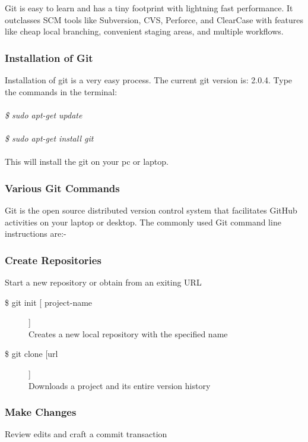 \noindent Git is easy to learn and has a tiny footprint with lightning fast performance. It outclasses SCM tools like Subversion, CVS, Perforce, and ClearCase with features like cheap local branching, convenient staging areas, and multiple workflows.

\subsubsection{Installation of Git}

Installation of git is a very easy process.
The current git version is: 2.0.4.
Type the commands in the terminal:\\\\
\emph{
\$ sudo apt-get update\\\\
\$ sudo apt-get install git\\\\}
This will install the git on your pc or laptop.

\subsubsection{Various Git Commands}

Git is the open source distributed version control system that facilitates GitHub activities on your laptop or desktop. The commonly used Git command line instructions are:-\\

\subsubsection{Create Repositories}
Start a new repository or obtain from an exiting URL

\begin{description}

\item [\$ git init [ project-name]]\\
Creates a new local repository with the specified name
\item [\$ git clone [url]]\\
Downloads a project and its entire version history

\end{description}


\subsubsection{Make Changes}
Review edits and craft a commit transaction

